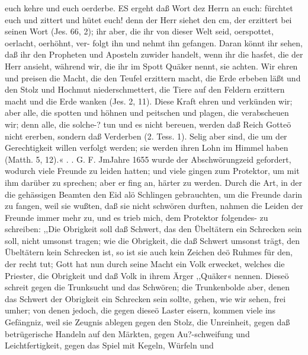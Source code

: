 euch kehre und euch oerderbe. ES ergeht daß Wort dez Herrn
an euch: fürchtet euch und zittert und hütet euch! denn der Herr
siehet den cm, der erzittert bei seinen Wort (Jes. 66, 2); ihr aber,
die ihr von dieser Welt seid, oerspottet, oerlacht, oerhöhnt, ver-
folgt ihn und nehmt ihn gefangen. Daran könnt ihr sehen, daß
ihr den Propheten und Aposteln zuwider handelt, wenn ihr die hasfet,
die der Herr ansieht, während wir, die ihr im Spott Quäker
nennt, sie achten. Wir ehren und preisen die Macht, die den
Teufel erzittern macht, die Erde erbeben läßt und den Stolz und
Hochmut niederschmettert, die Tiere auf den Feldern erzittern
macht und die Erde wanken (Jes. 2, 11). Diese Kraft ehren
und verkünden wir; aber alle, die spotten und höhnen und
peitschen und plagen, die verabscheuen wir; denn alle, die solche-?
tun und es nicht bereuen, werden daß Reich Gotteö nicht ererben,
sondern daß Verderben (2. Tess. 1).
Selig aber sind, die um der Gerechtigkeit willen verfolgt
werden; sie werden ihren Lohn im Himmel haben (Matth. 5, 12).« . .
G. F.
JmJahre 1655 wurde der Abschwörungzeid gefordert, wodurch
viele Freunde zu leiden hatten; und viele gingen zum Protektor, um
mit ihm darüber zu sprechen; aber er fing an, härter zu werden.
Durch die Art, in der die gehässigen Beamten den Eid alö
Schlingen gebrauchten, um die Freunde darin zu fangen, weil sie
wußten, daß sie nicht schwören durften, nahmen die Leiden der
Freunde immer mehr zu, und es trieb mich, dem Protektor folgendes-
zu schreiben:
,,Die Obrigkeit soll daß Schwert, das den Übeltätern ein
Schrecken sein soll, nicht umsonst tragen; wie die Obrigkeit, die
daß Schwert umsonst trägt, den Übeltätern kein Schrecken ist, so
ist sie auch kein Zeichen deö Ruhmes für den, der recht tut;
Gott hat nun durch seine Macht ein Volk erwecket, welches
die Priester, die Obrigkeit und daß Volk in ihrem Ärger ,,Quäker«
nennen. Dieseö schreit gegen die Trunksucht und das Schwören;
die Trunkenbolde aber, denen das Schwert der Obrigkeit ein
Schrecken sein sollte, gehen, wie wir sehen, frei umher; von denen
jedoch, die gegen dieseö Laster eisern, kommen viele ins Gefängniz,
weil sie Zeugnis ablegen gegen den Stolz, die Unreinheit, gegen
daß betrügerische Handeln auf den Märkten, gegen Au?-schweifung
und Leichtfertigkeit, gegen das Spiel mit Kegeln, Würfeln und


